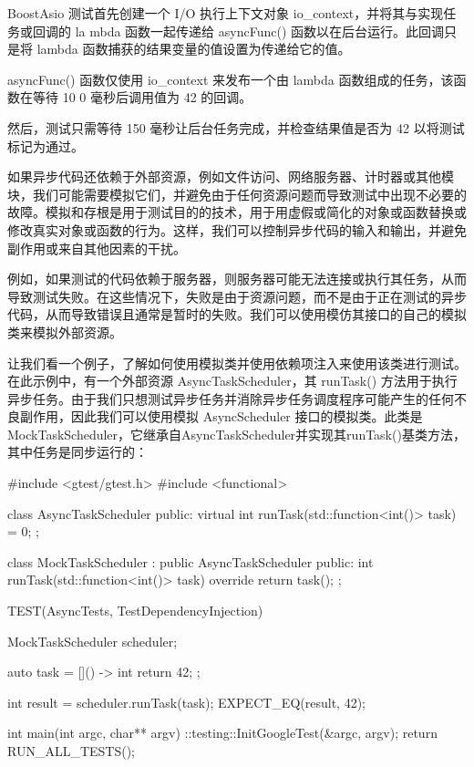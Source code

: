 BoostAsio 测试首先创建一个 I/O 执行上下文对象 io\_context，并将其与实现任务或回调的 la mbda 函数一起传递给 asyncFunc() 函数以在后台运行。此回调只是将 lambda 函数捕获的结果变量的值设置为传递给它的值。

asyncFunc() 函数仅使用 io\_context 来发布一个由 lambda 函数组成的任务，该函数在等待 10 0 毫秒后调用值为 42 的回调。

然后，测试只需等待 150 毫秒让后台任务完成，并检查结果值是否为 42 以将测试标记为通过。


如果异步代码还依赖于外部资源，例如文件访问、网络服务器、计时器或其他模块，我们可能需要模拟它们，并避免由于任何资源问题而导致测试中出现不必要的故障。模拟和存根是用于测试目的的技术，用于用虚假或简化的对象或函数替换或修改真实对象或函数的行为。这样，我们可以控制异步代码的输入和输出，并避免副作用或来自其他因素的干扰。

例如，如果测试的代码依赖于服务器，则服务器可能无法连接或执行其任务，从而导致测试失败。在这些情况下，失败是由于资源问题，而不是由于正在测试的异步代码，从而导致错误且通常是暂时的失败。我们可以使用模仿其接口的自己的模拟类来模拟外部资源。

让我们看一个例子，了解如何使用模拟类并使用依赖项注入来使用该类进行测试。在此示例中，有一个外部资源 AsyncTaskScheduler，其 runTask() 方法用于执行异步任务。由于我们只想测试异步任务并消除异步任务调度程序可能产生的任何不良副作用，因此我们可以使用模拟 AsyncScheduler 接口的模拟类。此类是 MockTaskScheduler，它继承自AsyncTaskScheduler并实现其runTask()基类方法，其中任务是同步运行的：

\begin{cpp}
#include <gtest/gtest.h>
#include <functional>

class AsyncTaskScheduler {
    public:
    virtual int runTask(std::function<int()> task) = 0;
};

class MockTaskScheduler : public AsyncTaskScheduler {
    public:
    int runTask(std::function<int()> task) override {
        return task();
    }
};

TEST(AsyncTests, TestDependencyInjection) {
    MockTaskScheduler scheduler;

    auto task = []() -> int {
        return 42;
    };

    int result = scheduler.runTask(task);
    EXPECT_EQ(result, 42);
}

int main(int argc, char** argv) {
    ::testing::InitGoogleTest(&argc, argv);
    return RUN_ALL_TESTS();
}
\end{cpp}

